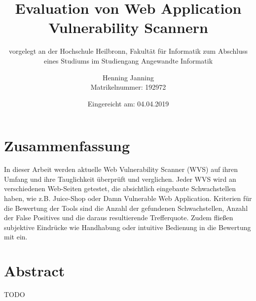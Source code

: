 \documentclass[12pt,oneside,a4paper,parskip,pointlessnumbers]{scrbook}
\def\BaAuthor{Henning Janning}
\def\BaTitle{Evaluation von Web Application Vulnerability Scannern}
\def\BaSupervisorOne{Prof. Dr.-Ing. Andreas Mayer}
\def\BaSupervisorTwo{Susanne Steuer, (M.Sc.) }
\def\BaDeadline{04.04.2019}
\def\MatNr{192972}
\begin{document}


\frontmatter
\titlehead{%
  {Hochschule Heilbronn\\
   Fakultät für Informatik}}
\subject{Bachelorarbeit}
\title{\BaTitle\\[15mm]}
\subtitle{\normalsize{vorgelegt an der Hochschule Heilbronn, Fakultät für Informatik zum Abschluss eines Studiums im Studiengang Angewandte Informatik}}
\author{\BaAuthor\\
\normalsize{Matrikelnummer: \MatNr}}
\bigskip
\date{\normalsize{Eingereicht am: \BaDeadline}}
\publishers{
  \normalsize{Erstpr\"{u}fer: \BaSupervisorOne}\\
  \normalsize{Zweitpr\"{u}ferin: \BaSupervisorTwo}\\
}


\maketitle



\section*{Zusammenfassung}

In dieser Arbeit werden aktuelle Web Vulnerability Scanner (WVS) auf ihren Umfang und ihre Tauglichkeit überprüft und verglichen. Jeder WVS wird an verschiedenen Web-Seiten getestet, die absichtlich eingebaute Schwachstellen haben, wie z.B. Juice-Shop oder Damn Vulnerable Web Application. Kriterien für die Bewertung der Tools sind die Anzahl der gefundenen Schwachstellen, Anzahl der False Positives und die daraus resultierende Trefferquote. Zudem fließen subjektive Eindrücke wie Handhabung oder intuitive Bedienung in die Bewertung mit ein.

\section*{Abstract}
TODO


\setcounter{secnumdepth}{3}
\setcounter{tocdepth}{3}
\tableofcontents

\listoffigures
{}

\listoftables
{}
\end{document}
